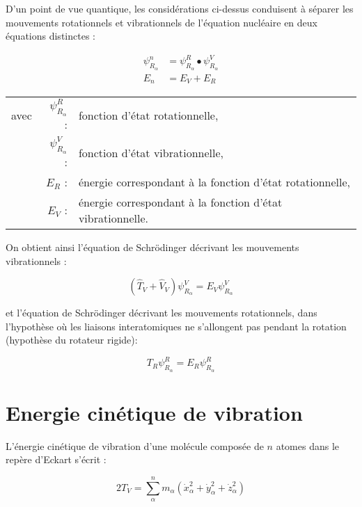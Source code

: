D'un point de vue quantique, les considérations ci-dessus conduisent à séparer les mouvements rotationnels et vibrationnels de l'équation nucléaire en deux équations distinctes :

\begin{align}
\psi^n_{R_{\alpha}} &= \psi^R_{R_{\alpha}} \bullet \psi^V_{R_{\alpha}} \\
E_n &= E_V + E_R
\end{align}
\begin{flushleft}
	\begin{tabular}{@{}lrp{10cm}}
		avec & $\psi^R_{R_{\alpha}}$ : & fonction d'état rotationnelle, \\
		& $\psi^V_{R_{\alpha}}$ : & fonction d'état vibrationnelle,\\
		& $E_R$ : & énergie correspondant à la fonction d'état rotationnelle,\\
		& $E_V$ : & énergie correspondant à la fonction d'état vibrationnelle.
	\end{tabular}
\end{flushleft}

On obtient ainsi l'équation de Schr\"{o}dinger décrivant les mouvements vibrationnels :

\begin{equation}
\left(\hat{T}_V + \hat{V}_V\right) \psi^V_{R_{\alpha}} = E_V \psi^V_{R_{\alpha}}
\end{equation}

\noindent et l'équation de Schr\"{o}dinger décrivant les mouvements rotationnels, dans l'hypothèse où les liaisons interatomiques ne s'allongent pas pendant la rotation (hypothèse du rotateur rigide):

\begin{equation}
T_R \psi^R_{R_{\alpha}} = E_R \psi^R_{R_{\alpha}}
\end{equation}


\section{Energie cinétique de vibration }

L'énergie cinétique de vibration d'une molécule composée de $n$ atomes dans le repère d'Eckart s'écrit :

\begin{equation}
2T_V = \sum^n_{\alpha}m_{\alpha}\left( \dot{x}^2_{\alpha} + \dot{y}^2_{\alpha} + \dot{z}^2_{\alpha}\right)
\end{equation}

